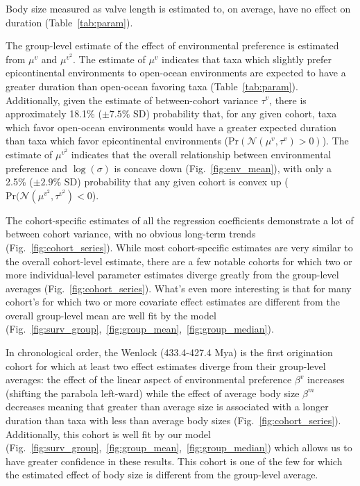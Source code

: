 \documentclass[11pt]{article}
\begin{document}
Body size measured as valve length is estimated to, on average, have no effect on duration (Table~\ref{tab:param}).

The group-level estimate of the effect of environmental preference is estimated from \(\mu^{v}\) and \(\mu^{v^{2}}\). The estimate of \(\mu^{v}\) indicates that taxa which slightly prefer epicontinental environments to open-ocean environments are expected to have a greater duration than open-ocean favoring taxa (Table~\ref{tab:param}). Additionally, given the estimate of between-cohort variance \(\tau^{v}\), there is approximately 18.1\% (\(\pm 7.5\%\) SD) probability that, for any given cohort, taxa which favor open-ocean environments would have a greater expected duration than taxa which favor epicontinental environments (\(\mathrm{Pr}(\mathcal{N}(\mu^{v}, \tau^{v}) > 0)\)). The estimate of \(\mu^{v^{2}}\) indicates that the overall relationship between environmental preference and \(\log(\sigma)\) is concave down (Fig.~\ref{fig:env_mean}), with only a 2.5\% (\(\pm 2.9\%\) SD) probability that any given cohort is convex up (\(\mathrm{Pr}(\mathcal{N}(\mu^{v^{2}}, \tau^{v^{2}}) < 0\)).

The cohort-specific estimates of all the regression coefficients demonstrate a lot of between cohort variance, with no obvious long-term trends (Fig.~\ref{fig:cohort_series}). While most cohort-specific estimates are very similar to the overall cohort-level estimate, there are a few notable cohorts for which two or more individual-level parameter estimates diverge greatly from the group-level averages (Fig.~\ref{fig:cohort_series}). What's even more interesting is that for many cohort's for which two or more covariate effect estimates are different from the overall group-level mean are well fit by the model (Fig.~\ref{fig:surv_group},~\ref{fig:group_mean},~\ref{fig:group_median}).

In chronological order, the Wenlock (433.4-427.4 Mya) is the first origination cohort for which at least two effect estimates diverge from their group-level averages: the effect of the linear aspect of environmental preference \(\beta^{v}\) increases (shifting the parabola left-ward) while the effect of average body size \(\beta^{m}\) decreases meaning that greater than average size is associated with a longer duration than taxa with less than average body sizes (Fig.~\ref{fig:cohort_series}). Additionally, this cohort is well fit by our model (Fig.~\ref{fig:surv_group},~\ref{fig:group_mean},~\ref{fig:group_median}) which allows us to have greater confidence in these results. This cohort is one of the few for which the estimated effect of body size is different from the group-level average.
\end{document}
